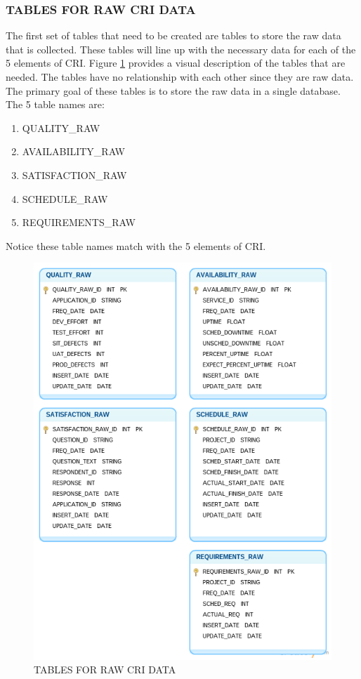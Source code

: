 \documentclass[SDSUThesis.tex]{subfiles}
\begin{document}
   \subsubsection{TABLES FOR RAW CRI DATA}
   
        The first set of tables that need to be created are tables
        to store the raw data that is collected.  These tables
        will line up with the necessary data for each of the 5 elements
        of CRI.  Figure \ref{fig:raw} provides a visual description
        of the tables that are needed.  The tables have no relationship
        with each other since they are raw data.  The primary goal of
        these tables is to store the raw data in a single database. The
        5 table names are:
        \begin{enumerate}
            \item QUALITY\_RAW
            \item AVAILABILITY\_RAW
            \item SATISFACTION\_RAW
            \item SCHEDULE\_RAW
            \item REQUIREMENTS\_RAW
        \end{enumerate}
        Notice these table names match with the 5 elements of CRI.
   
       \begin{figure}[ht]
            \centering
            \includegraphics[scale=.55]{images/raw_tables.png}
            \caption{TABLES FOR RAW CRI DATA}
            \label{fig:raw}
        \end{figure}
        
\end{document}
